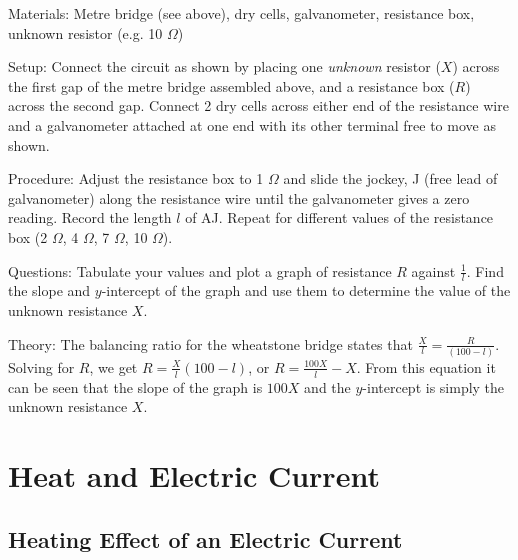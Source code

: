 \begin{multicols}{2}
\begin{description*}
\item[Materials:]{Metre bridge (see above), dry cells, galvanometer, resistance box, unknown resistor (e.g. 10 $\Omega$)}
\item[Setup:]{Connect the circuit as shown by placing one \emph{unknown} resistor ($X$) across the first gap of the metre bridge assembled above, and a resistance box ($R$) across the second gap. Connect 2 dry cells across either end of the resistance wire and a galvanometer attached at one end with its other terminal free to move as shown.}
\item[Procedure:]{Adjust the resistance box to 1 $\Omega$ and slide the jockey, J (free lead of galvanometer) along the resistance wire until the galvanometer gives a zero reading. Record the length $l$ of AJ. Repeat for different values of the resistance box (2 $\Omega$, 4 $\Omega$, 7 $\Omega$, 10 $\Omega$).}
\item[Questions:]{Tabulate your values and plot a graph of resistance $R$ against $\frac{1}{l}$. Find the slope and $y$-intercept of the graph and use them to determine the value of the unknown resistance $X$.}
\item[Theory:]{The balancing ratio for the wheatstone bridge states that $\frac{X}{l} = \frac{R}{(100-l)}$. Solving for $R$, we get $R = \frac{X}{l}(100-l)$, or $R = \frac{100X}{l}-X$. From this equation it can be seen that the slope of the graph is $100X$ and the $y$-intercept is simply the unknown resistance $X$.}
\end{description*}

\vfill
\columnbreak


\section*{Heat and Electric Current}


\subsection{Heating Effect of an Electric Current}


\end{multicols}
